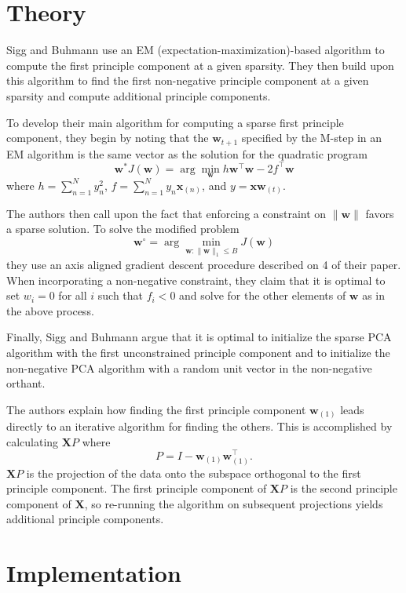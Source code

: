 \documentclass[twocolumn]{article}
\begin{document}
\section{Theory}

Sigg and Buhmann use an EM (expectation-maximization)-based algorithm
to compute the first principle component at a given sparsity.
They then build upon this algorithm to find the first non-negative
principle component at a given sparsity and compute additional
principle components.

To develop their main algorithm for computing a sparse first principle
component, they begin by noting that the $\mathbf{w}_{t+1}$
specified by the M-step in an EM algorithm is the same vector as the
solution for the quadratic program
\[
\mathbf{w}^* J(\mathbf{w}) =
\arg\min_{\mathbf{w}} h \mathbf{w}^\intercal \mathbf{w}
  - 2 f^\intercal \mathbf{w}
\]
where $h = \sum_{n=1}^N y_n^2$, $f = \sum_{n=1}^N y_n \mathbf{x}_{(n)}$,
and $y = \mathbf{x} \mathbf{w}_{(t)}$.

The authors then call upon the fact that enforcing a constraint
on $\|\mathbf{w}\|$ favors a sparse solution.
To solve the modified problem
\[
\mathbf{w}^\circ = \arg\min_{
  \mathbf
{w} : \|\mathbf
{w}\|_1 \le B
} J(\mathbf{w})
\]
they use an axis aligned gradient descent procedure
described on 4 of their paper.
When incorporating a non-negative constraint, they claim that it is
optimal to set $w_i = 0$ for all $i$ such that $f_i < 0$
and solve for the other elements of $\mathbf{w}$ as in the above process.

Finally, Sigg and Buhmann argue that it is optimal to initialize
the sparse PCA algorithm with the first unconstrained principle component
and to initialize the non-negative PCA algorithm with a random unit vector
in the non-negative orthant.

The authors explain how finding the first principle component
$\mathbf{w}_{(1)}$ leads directly to an iterative algorithm
for finding the others.
This is accomplished by calculating $\mathbf{X} P$
where \[ P = I - \mathbf{w}_{(1)} \mathbf{w}_{(1)}^\intercal \textrm{.} \]
$\mathbf{X}P$ is the projection of the data onto the subspace orthogonal
to the first principle component.
The first principle component of $\mathbf{X} P$ is the second
principle component of $\mathbf{X}$, so re-running the algorithm
on subsequent projections yields additional principle components.

\section{Implementation}
\end{document}
